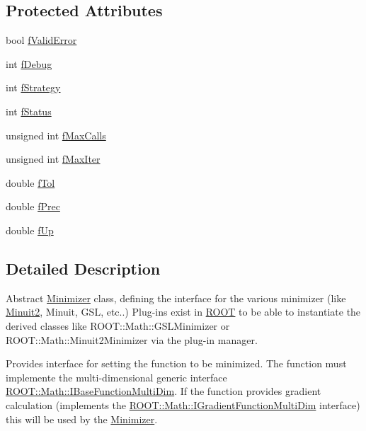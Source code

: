 \subsection*{Protected Attributes}
\begin{DoxyCompactItemize}
\item 
bool \mbox{\hyperlink{classROOT_1_1Math_1_1Minimizer_a4df6916d81a51c275a6fefd1328bfaa4}{f\+Valid\+Error}}
\item 
int \mbox{\hyperlink{classROOT_1_1Math_1_1Minimizer_a76f49eba837f9697e9eece2060c6242a}{f\+Debug}}
\item 
int \mbox{\hyperlink{classROOT_1_1Math_1_1Minimizer_acf3d405ba512a48583aceb977a325d91}{f\+Strategy}}
\item 
int \mbox{\hyperlink{classROOT_1_1Math_1_1Minimizer_a3e2e824d73e87e3dd48b1938d668dc34}{f\+Status}}
\item 
unsigned int \mbox{\hyperlink{classROOT_1_1Math_1_1Minimizer_a5f1dd8eeeef7e3973b04bff44899546b}{f\+Max\+Calls}}
\item 
unsigned int \mbox{\hyperlink{classROOT_1_1Math_1_1Minimizer_a0de67af9c978eea0348557265e164134}{f\+Max\+Iter}}
\item 
double \mbox{\hyperlink{classROOT_1_1Math_1_1Minimizer_a534a1f79f43cc5c3d241edecde776da1}{f\+Tol}}
\item 
double \mbox{\hyperlink{classROOT_1_1Math_1_1Minimizer_a5cf4928449686cde8228f24f844a8944}{f\+Prec}}
\item 
double \mbox{\hyperlink{classROOT_1_1Math_1_1Minimizer_aa73e906ab56ef18f5f429cfcc0871db1}{f\+Up}}
\end{DoxyCompactItemize}


\subsection{Detailed Description}
Abstract \mbox{\hyperlink{classROOT_1_1Math_1_1Minimizer}{Minimizer}} class, defining the interface for the various minimizer (like \mbox{\hyperlink{namespaceROOT_1_1Minuit2}{Minuit2}}, Minuit, G\+SL, etc..) Plug-\/in\textquotesingle{}s exist in \mbox{\hyperlink{namespaceROOT}{R\+O\+OT}} to be able to instantiate the derived classes like R\+O\+O\+T\+::\+Math\+::\+G\+S\+L\+Minimizer or R\+O\+O\+T\+::\+Math\+::\+Minuit2\+Minimizer via the plug-\/in manager.

Provides interface for setting the function to be minimized. The function must implemente the multi-\/dimensional generic interface \mbox{\hyperlink{classROOT_1_1Math_1_1IBaseFunctionMultiDim}{R\+O\+O\+T\+::\+Math\+::\+I\+Base\+Function\+Multi\+Dim}}. If the function provides gradient calculation (implements the \mbox{\hyperlink{classROOT_1_1Math_1_1IGradientFunctionMultiDim}{R\+O\+O\+T\+::\+Math\+::\+I\+Gradient\+Function\+Multi\+Dim}} interface) this will be used by the \mbox{\hyperlink{classROOT_1_1Math_1_1Minimizer}{Minimizer}}.

